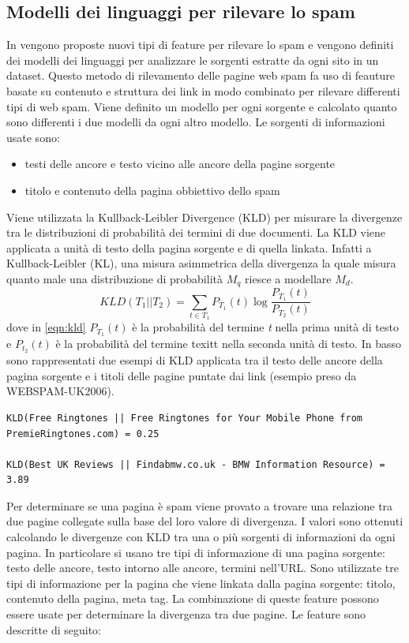 \subsection{Modelli dei linguaggi per rilevare lo spam}
In \cite{Martinez-Romo:2009:WSI:1531914.1531920} vengono proposte nuovi tipi di feature per rilevare lo spam e vengono definiti dei modelli dei linguaggi per analizzare le sorgenti estratte da ogni sito in un dataset.  Questo metodo di rilevamento delle pagine web spam fa uso di feauture basate su contenuto e struttura dei link in modo combinato per rilevare differenti tipi di web spam. Viene definito un modello per ogni sorgente e calcolato quanto sono differenti i due modelli  da ogni altro modello. Le sorgenti di informazioni usate sono: 
\begin{itemize}
\item testi delle ancore e testo vicino alle ancore della pagine sorgente
\item titolo e contenuto della pagina obbiettivo dello spam
\end{itemize}
Viene utilizzata la Kullback-Leibler Divergence (KLD) per misurare la divergenze tra le distribuzioni di probabilità dei termini di due documenti. La KLD viene applicata a unità di testo della pagina sorgente e di quella linkata. Infatti a Kullback-Leibler (KL), una misura  asimmetrica della divergenza la quale misura quanto male una distribuzione di probabilità \(M_q\) riesce a modellare \(M_d\).
\begin{equation}
KLD(T_1||T_2) = \sum_{t \in T_1} P_{T_1}(t) \log \frac{P_{T_1}(t)}{P_{T_2}(t)}
\label{eqn:kld}
\end{equation}
dove in \ref{eqn:kld} \(P_{T_1}(t)\) è la probabilità del termine \textit{t} nella prima unità di testo e \(P_{t_2}(t)\) è la probabilità del termine texit{t} nella seconda unità di testo. In basso sono rappresentati due esempi di KLD applicata tra il testo delle ancore della pagina sorgente e i titoli delle pagine puntate dai link (esempio preso da WEBSPAM-UK2006).
\begin{lstlisting}[frame=trbl,postbreak=\space, breakindent=5pt, breaklines]
KLD(Free Ringtones || Free Ringtones for Your Mobile Phone from PremieRingtones.com) = 0.25

KLD(Best UK Reviews || Findabmw.co.uk - BMW Information Resource) = 3.89
\end{lstlisting}
Per determinare se una pagina è spam viene provato a trovare una relazione tra due pagine collegate sulla base del loro valore di divergenza. I valori sono ottenuti calcolando le divergenze con KLD tra una o più sorgenti di informazioni da ogni pagina. In particolare si usano tre tipi di informazione di una pagina sorgente: testo delle ancore, testo intorno alle ancore, termini nell'URL. Sono utilizzate tre tipi di informazione per la pagina che viene linkata dalla pagina sorgente: titolo, contenuto della pagina, meta tag. La combinazione di queste feature possono essere usate per determinare la divergenza tra due pagine. Le feature sono descritte di seguito:
